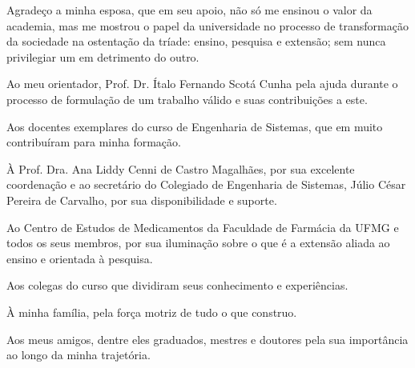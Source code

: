 
\begin{agradecimentos}


Agradeço a minha esposa, que em seu apoio, não só me ensinou o valor da academia, mas me mostrou o papel da universidade no processo de transformação da sociedade na ostentação da tríade: ensino, pesquisa e extensão; sem nunca privilegiar um em detrimento do outro.

Ao meu orientador, Prof. Dr. Ítalo Fernando Scotá Cunha pela ajuda durante o processo de formulação de um trabalho válido e suas contribuições a este.

Aos docentes exemplares do curso de Engenharia de Sistemas, que em muito contribuíram para minha formação.

À Prof. Dra. Ana Liddy Cenni de Castro Magalhães, por sua excelente coordenação e ao secretário do Colegiado de Engenharia de Sistemas, Júlio César Pereira de Carvalho, por sua disponibilidade e suporte.

Ao Centro de Estudos de Medicamentos da Faculdade de Farmácia da UFMG e todos os seus membros, por sua iluminação sobre o que é a extensão aliada ao ensino e orientada à pesquisa.

Aos colegas do curso que dividiram seus conhecimento e experiências.

À minha família, pela força motriz de tudo o que construo.

Aos meus amigos, dentre eles graduados, mestres e doutores pela sua importância ao longo da minha trajetória.

\end{agradecimentos}
